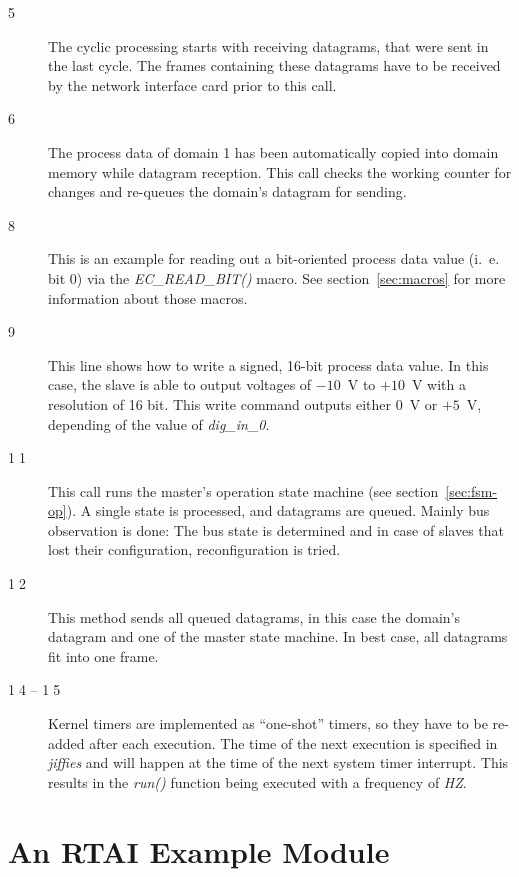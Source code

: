 \documentclass[a4paper,12pt,BCOR6mm,bibtotoc,idxtotoc]{scrbook}
\begin{document}
\begin{description}
\item[\normalfont\textcircled{\tiny 5}] The cyclic processing starts
  with receiving datagrams, that were sent in the last cycle. The
  frames containing these datagrams have to be received by the network
  interface card prior to this call.
\item[\normalfont\textcircled{\tiny 6}] The process data of domain 1
  has been automatically copied into domain memory while datagram
  reception. This call checks the working counter for changes and
  re-queues the domain's datagram for sending.
\item[\normalfont\textcircled{\tiny 8}] This is an example for reading
  out a bit-oriented process data value (i.~e. bit 0) via the
  \textit{EC\_READ\_BIT()} macro. See section~\ref{sec:macros} for
  more information about those macros.
\item[\normalfont\textcircled{\tiny 9}] This line shows how to write a
  signed, 16-bit process data value. In this case, the slave is able
  to output voltages of $-10$~V to $+10$~V with a resolution of 16
  bit.  This write command outputs either $0$~V or $+5$~V, depending
  of the value of \textit{dig\_in\_0}.
\item[\normalfont\textcircled{\tiny 11}] This call runs the master's
  operation state machine (see section~\ref{sec:fsm-op}). A single
  state is processed, and datagrams are queued. Mainly bus observation
  is done: The bus state is determined and in case of slaves that lost
  their configuration, reconfiguration is tried.
\item[\normalfont\textcircled{\tiny 12}] This method sends all queued
  datagrams, in this case the domain's datagram and one of the master
  state machine. In best case, all datagrams fit into one frame.
\item[\normalfont\textcircled{\tiny 14} -- \textcircled{\tiny 15}]
  Kernel timers are implemented as ``one-shot'' timers, so they have
  to be re-added after each execution. The time of the next execution
  is specified in \textit{jiffies} and will happen at the time of the
  next system timer interrupt. This results in the \textit{run()}
  function being executed with a frequency of \textit{HZ}.
\end{description}


\section{An RTAI Example Module}
\label{sec:rtai}
\end{document}
